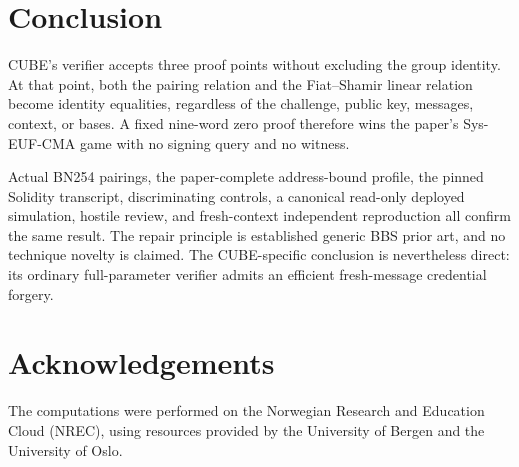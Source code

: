 \documentclass[10pt,a4paper]{article}
\begin{document}
\section{Conclusion}

CUBE's verifier accepts three proof points without excluding the group
identity. At that point, both the pairing relation and the Fiat--Shamir linear
relation become identity equalities, regardless of the challenge, public key,
messages, context, or bases. A fixed nine-word zero proof therefore wins the
paper's Sys-EUF-CMA game with no signing query and no witness.

Actual BN254 pairings, the paper-complete address-bound profile, the pinned
Solidity transcript, discriminating controls, a canonical read-only deployed
simulation, hostile review, and fresh-context independent reproduction all
confirm the same result. The repair principle is established generic BBS
prior art, and no technique novelty is claimed. The CUBE-specific conclusion
is nevertheless direct: its ordinary full-parameter verifier admits an
efficient fresh-message credential forgery.

\section*{Acknowledgements}

The computations were performed on the Norwegian Research and Education Cloud (NREC), using resources provided by the University of Bergen and the University of Oslo.
\end{document}
